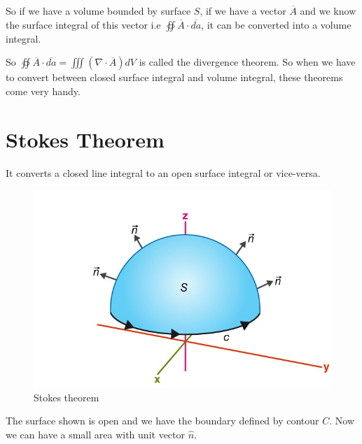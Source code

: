 
So if we have a volume bounded by surface $S$, if we have a vector $\overline{A}$ and we know the surface integral of this vector i.e $\oiint \overline{A}\cdot\overline{da}$, it can be converted into a volume integral.


So $\oiint \overline{A} \cdot \overline{da} = \iiint (\nabla \cdot \overline{A})dV$ is called the divergence theorem. So when we have to convert between closed surface integral and volume integral, these theorems come very handy.

\section{Stokes Theorem}
It converts a closed line integral to an open surface integral or vice-versa.


\begin{figure}
	\centering
	\includegraphics[width=0.7\linewidth]{./graphics/fig17.8}
	\caption{Stokes theorem}
\end{figure}
 

The surface shown is open and we have the boundary defined by contour $C$. Now we can have a small area with unit vector $\hat n$.

